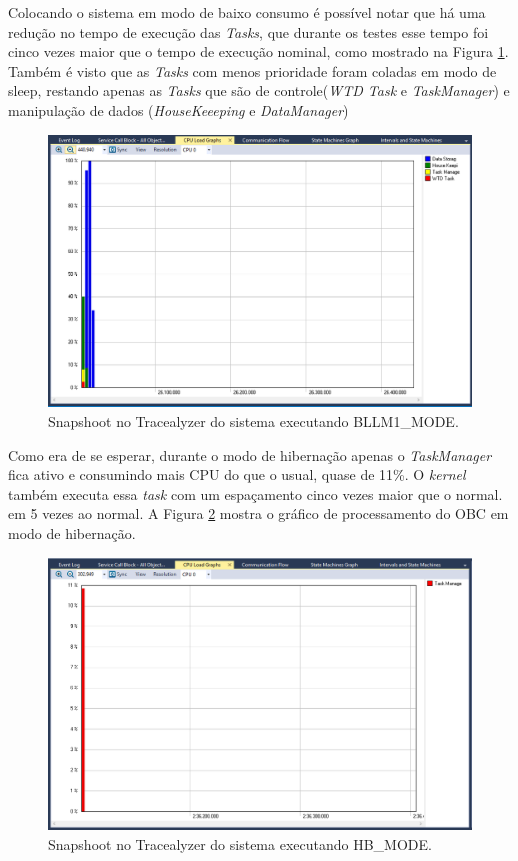 \newpage
Colocando o sistema em modo de baixo consumo é possível notar que há uma redução no tempo de execução das \textit{Tasks}, que durante os testes esse tempo foi cinco vezes maior que o tempo de execução nominal, como mostrado na Figura \ref{trace_snapshoot_5}. Também é visto que as \textit{Tasks} com menos prioridade foram coladas em modo de sleep, restando apenas as \textit{Tasks} que são de controle(\textit{WTD Task} e \textit{TaskManager}) e manipulação de dados (\textit{HouseKeeeping} e \textit{DataManager})

\begin{figure}[h]
	\centering
	
	\includegraphics[keepaspectratio=true,scale=0.43]{figuras/trace_snapshoot_5.PNG}
	\caption{Snapshoot no Tracealyzer do sistema executando BLLM1\_MODE.}
	\label{trace_snapshoot_5}
\end{figure}
\FloatBarrier

Como era de se esperar, durante o modo de hibernação apenas o \textit{TaskManager} fica ativo e consumindo mais CPU do que o usual, quase de 11\%. O \textit{kernel} também executa essa \textit{task} com um espaçamento cinco vezes maior que o normal. em 5 vezes ao normal. A Figura \ref{trace_snapshoot_4} mostra o gráfico de processamento do OBC em modo de hibernação.


\begin{figure}[h]
	\centering
	
	\includegraphics[keepaspectratio=true,scale=0.41]{figuras/trace_snapshoot_4.PNG}
	\caption{Snapshoot no Tracealyzer do sistema executando HB\_MODE.}
	\label{trace_snapshoot_4}
\end{figure}
\FloatBarrier

